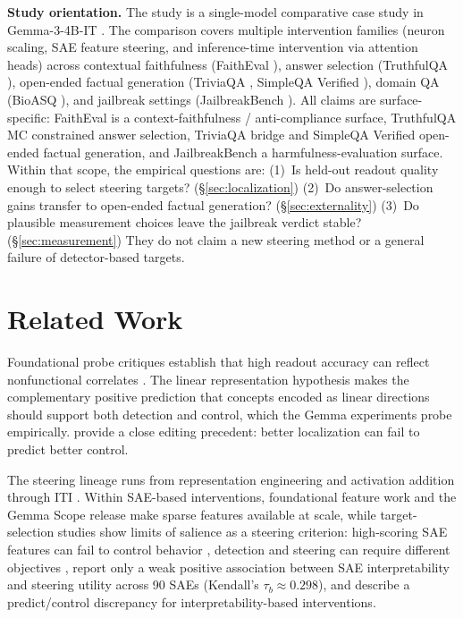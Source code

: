 \documentclass{article}
\begin{document}
\textbf{Study orientation.}
The study is a single-model comparative case study in Gemma-3-4B-IT \citep{gemma2025}.
The comparison covers multiple intervention families (neuron scaling, SAE feature steering, and inference-time intervention via attention heads) across contextual faithfulness (FaithEval \citep{ming2025faitheval}), answer selection (TruthfulQA \citep{lin2022truthfulqa}), open-ended factual generation (TriviaQA \citep{joshi2017triviaqa}, SimpleQA Verified \citep{haas2025simpleqaverified}), domain QA (BioASQ \citep{tsatsaronis2015bioasq}), and jailbreak settings (JailbreakBench \citep{chao2024jailbreakbench}).
All claims are surface-specific: FaithEval is a context-faithfulness / anti-compliance surface, TruthfulQA MC constrained answer selection, TriviaQA bridge and SimpleQA Verified open-ended factual generation, and JailbreakBench a harmfulness-evaluation surface.
Within that scope, the empirical questions are:
(1)~Is held-out readout quality enough to select steering targets? (\S\ref{sec:localization})
(2)~Do answer-selection gains transfer to open-ended factual generation? (\S\ref{sec:externality})
(3)~Do plausible measurement choices leave the jailbreak verdict stable? (\S\ref{sec:measurement})
They do not claim a new steering method or a general failure of detector-based targets.

\section{Related Work}
\label{sec:related}

Foundational probe critiques establish that high readout accuracy can reflect nonfunctional correlates \citep{hewitt2019control,elazar2021amnesic,kumar2022probes}. The linear representation hypothesis \citep{park2024linear} makes the complementary positive prediction that concepts encoded as linear directions should support both detection and control, which the Gemma experiments probe empirically. \citet{hase2023localization} provide a close editing precedent: better localization can fail to predict better control.

The steering lineage runs from representation engineering and activation addition \citep{zou2023repe,turner2024steering} through ITI \citep{li2023iti}. Within SAE-based interventions, foundational feature work \citep{cunningham2023saes} and the Gemma Scope release \citep{lieberum2024gemmascope} make sparse features available at scale, while target-selection studies show limits of salience as a steering criterion: high-scoring SAE features can fail to control behavior \citep{arad2025saes}, detection and steering can require different objectives \citep{wu2025axbench}, \citet{wang2026interpretability} report only a weak positive association between SAE interpretability and steering utility across 90 SAEs (Kendall's $\tau_b \approx 0.298$), and \citet{bhalla2024unifying} describe a predict/control discrepancy for interpretability-based interventions.
\end{document}
